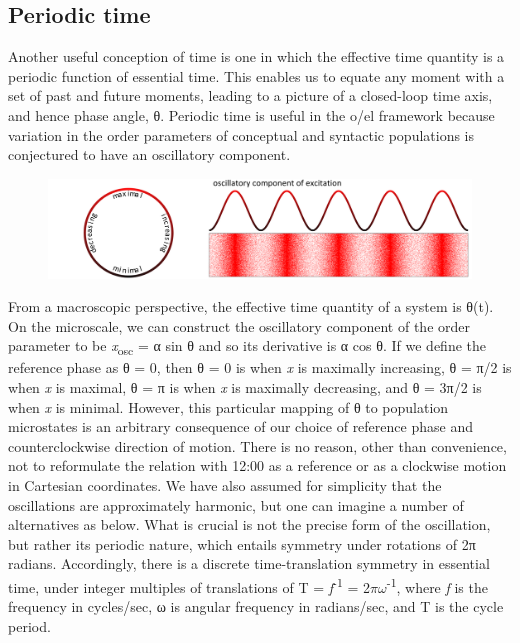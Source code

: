 \subsection{Periodic time}

Another useful conception of time is one in which the effective time quantity is a periodic function of  essential time. This enables us to equate any moment with a set of past and future moments, leading to a picture of a closed-loop time axis, and hence phase angle, θ. Periodic time is useful in the o/el framework because variation in the order parameters of conceptual and syntactic populations is conjectured to have an oscillatory component.

  
\begin{figure}
\includegraphics[width=\textwidth]{figures/Tilsen-img46.png}
\caption{\missingcaption}
\label{fig:}
\end{figure}
 

  From a macroscopic perspective, the effective time quantity of a system is θ(t). On the microscale, we can construct the oscillatory component of the order parameter to be \textit{x}\textsubscript{osc} = α sin θ and so its derivative is α cos θ. If we define the reference phase as θ = 0, then θ = 0 is when \textit{x} is maximally increasing, θ = π/2 is when \textit{x} is maximal, θ = π is when \textit{x} is maximally decreasing, and θ = 3π/2 is when \textit{x} is minimal. However, this particular mapping of θ to population microstates is an arbitrary consequence of our choice of reference phase and counterclockwise direction of motion. There is no reason, other than convenience, not to reformulate the relation with 12:00 as a reference or as a clockwise motion in Cartesian coordinates. We have also assumed for simplicity that the oscillations are approximately harmonic, but one can imagine a number of alternatives as below. What is crucial is not the precise form of the oscillation, but rather its periodic nature, which entails symmetry under rotations of 2π radians. Accordingly, there is a discrete time-translation symmetry in essential time, under integer multiples of translations of T = \textit{f}\textsuperscript{{}-1} = 2$\pi \omega $\textsuperscript{{}-1}, where \textit{f} is the frequency in cycles/sec, ω is angular frequency in radians/sec, and T is the cycle period.

